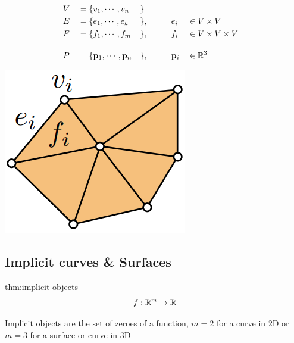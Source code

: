 \documentclass{article}
\begin{document}
\begin{minipage}{0.7\textwidth}
    \begin{alignat*}{6}
        &V && = \{ v_1, \cdots, v_n&&\}\\
        &E && = \{ e_1, \cdots, e_k&&\}, \qquad &&e_i &&\in V \times V\\
        &F && = \{ f_1, \cdots, f_m&&\}, &&f_i &&\in V \times V \times V\\[10px]
        &P && = \{\mathbf{p}_{1}, \cdots, \mathbf{p}_{n}&&\}, &&\mathbf{p}_i &&\in \mathbb{R}^3\\
    \end{alignat*}
\end{minipage}
\begin{minipage}{0.25\textwidth}
    \includegraphics[width=0.9\linewidth]{images/mesh_graph.png}
\end{minipage}




\subsection{Implicit curves \& Surfaces} \label{implicit-curves/surfaces}

\begin{defin}{thm:implicit-objects}
    \[
        f: \mathbb{R}^m \to \mathbb{R}
    \]

    Implicit objects are the set of zeroes of a function, \(m=2\) for a curve in 2D or \(m=3\) for a surface
    or curve in 3D
\end{defin}
\end{document}
